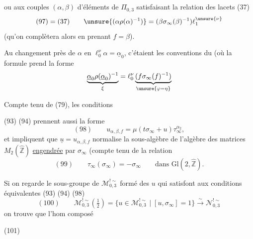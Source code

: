 
ou aux couples $(\alpha,\beta)$ d'éléments de $\widehat{\Pi}_{0,3}$
satisfaisant la relation des lacets (37)
\[
 (97)=(37)\qquad
 \unsure{(\alpha\rho(\alpha)^{-1})}
 =(\beta\sigma_\infty(\beta)^{-1})\ell_1^{\unsure{\nu}}
\]
(qu'on complètera alors en prenant $f=\beta$).


Au changement près de $\alpha$ en $\ell_0^\nu\alpha=\underline{\alpha}_0$,
c'étaient les conventions du  (où la formule prend
 la forme
\[
 \underbrace{\underline{\alpha}_0\rho(\underline{\alpha}_0)^{-1}}_{\xi}
 =\ell_0^\nu
 \underbrace{(f\sigma_\infty(f)^{-1})}_{\unsure{\varphi=\eta}}
\]

Compte tenu de (79), les conditions


(93) (94) prennent aussi la forme
\[
 (98)\qquad u_{\alpha,\beta,f}
 =\mu(t\sigma_\infty+u)\tau_\infty^{\alpha_2},
\]
et impliquent que $\underline{u}=u_{\alpha,\beta,f}$
 normalise la sous-algèbre de l'algèbre des matrices
$M_2(\widehat{\mathbb Z})$ \uline{engendrée} par $\sigma_\infty$
(compte tenu de la relation
\[
 (99)\qquad \tau_\infty(\sigma_\infty)=-\sigma_\infty
 \qquad\text{dans }\mathrm{Gl}(2,\widehat{\mathbb Z}).
\]

Si on regarde le sous-groupe de $\mathcal M_{0,3}^{!\sim}$
formé des $u$ qui satisfont aux conditions équivalentes (93) (94) (98)
\[
 (100)\qquad
 \mathcal M_{0,3}^{!\sim}\left(\tfrac12\right)
 =
 \{u\in\mathcal M_{0,3}^{!\sim}\mid [u,\sigma_\infty]=1\}
 \overset{\sim}{\longrightarrow}\mathcal N_{0,3}^{!\sim}
\]
on trouve que l'hom composé


\begin{samepage}
(101)
\end{samepage}

